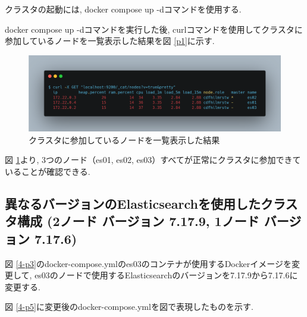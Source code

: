 


クラスタの起動には, docker compose up -dコマンドを使用する.

docker compose up -dコマンドを実行した後, curlコマンドを使用してクラスタに参加しているノードを一覧表示した結果を図 \ref{p1}に示す.

\begin{figure}
  \begin{center}
    \includegraphics[width=120mm]{sotu/figure/curl-same.png}
    \caption{クラスタに参加しているノードを一覧表示した結果}
    \label{4-p4}
  \end{center}
\end{figure}

図 \ref{4-p4}より, 3つのノード（es01, es02, es03）すべてが正常にクラスタに参加できていることが確認できる.

\subsection{異なるバージョンのElasticsearchを使用したクラスタ構成 (2ノード バージョン 7.17.9, 1ノード バージョン 7.17.6)}

図 \ref{4-p3}のdocker-compose.ymlのes03のコンテナが使用するDockerイメージを変更して, es03のノードで使用するElasticsearchのバージョンを7.17.9から7.17.6に変更する.

図 \ref{4-p5}に変更後のdocker-compose.ymlを図で表現したものを示す.

